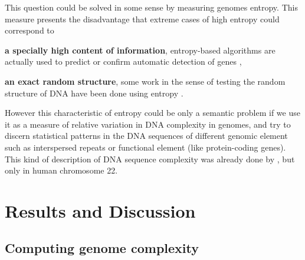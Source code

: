 \cite{Gregory2005}

This question could be solved in some sense by measuring genomes entropy. This measure presents the disadvantage that extreme cases of high entropy could correspond to \begin{inparaenum} \item {\bf a specially high content of information}, entropy-based algorithms are actually used to predict or confirm automatic detection of genes \cite{Du2006,Gerstein2007}, \item {\bf an exact random structure}, some work in the sense of testing the random structure of DNA have been done using entropy \cite{Loewenstern1999}. \end{inparaenum} However this characteristic of entropy could be only a semantic problem if we use it as a measure of relative variation in DNA complexity in genomes, and try to discern statistical patterns in the DNA sequences of different genomic element such as interspersed repeats or functional element (like protein-coding genes). This kind of description of DNA sequence complexity was already done by \cite{Holste2001}, but only in human chromosome 22.

\section{Results and Discussion}
\label{sec:dna_struct-result}

\subsection{Computing genome complexity}
\label{sec:comp-genome-compl}


